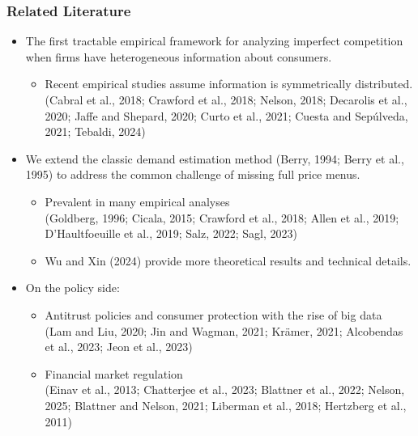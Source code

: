 \documentclass[10pt,aspectratio=169]{beamer}
\begin{document}
\begin{frame}
\frametitle{Related Literature}

\begin{itemize}
    \item The first tractable empirical framework for analyzing imperfect competition when firms have heterogeneous information about consumers.
    \begin{itemize}
        \item Recent empirical studies assume information is symmetrically distributed. \\
        \small{(Cabral et al., 2018; Crawford et al., 2018; Nelson, 2018; Decarolis et al., 2020; Jaffe and Shepard, 2020; Curto et al., 2021; Cuesta and Sepúlveda, 2021; Tebaldi, 2024)}
    \end{itemize}
    \medskip

    \item We extend the classic demand estimation method (Berry, 1994; Berry et al., 1995) to address the common challenge of missing full price menus.
    \begin{itemize}
        \item Prevalent in many empirical analyses \\
        \tiny{(Goldberg, 1996; Cicala, 2015; Crawford et al., 2018; Allen et al., 2019; D'Haultfoeuille et al., 2019; Salz, 2022; Sagl, 2023)}
        \item Wu and Xin (2024) provide more theoretical results and technical details.
    \end{itemize}
    \medskip

    \item On the policy side:
    \begin{itemize}
        \item Antitrust policies and consumer protection with the rise of big data \\
        \tiny{(Lam and Liu, 2020; Jin and Wagman, 2021; Krämer, 2021; Alcobendas et al., 2023; Jeon et al., 2023)}
        \item Financial market regulation \\
        \tiny{(Einav et al., 2013; Chatterjee et al., 2023; Blattner et al., 2022; Nelson, 2025; Blattner and Nelson, 2021; Liberman et al., 2018; Hertzberg et al., 2011)}
    \end{itemize}
\end{itemize}

\end{frame}
\end{document}

